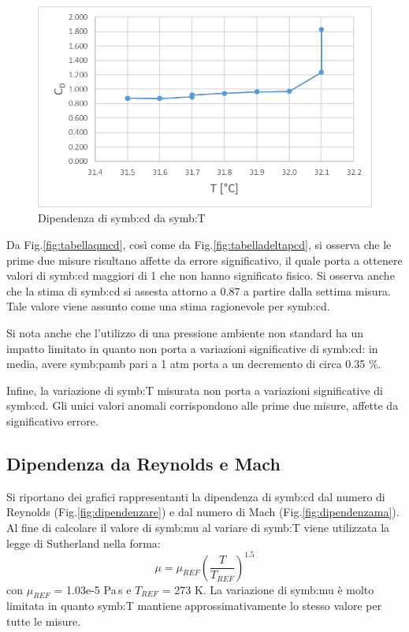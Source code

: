 \begin{figure}
	\centering
	\includegraphics[width=0.5\linewidth]{"chapters/5-laboratorio/tabellaTcd"}
	\caption{Dipendenza di \gls{symb:cd} da \gls{symb:T}}
	\label{fig:tabellatcd}
\end{figure}
Da Fig.\ref{fig:tabellaqmcd}, così come da Fig.\ref{fig:tabelladeltapcd}, si osserva che le prime due misure risultano affette da errore significativo, il quale porta a ottenere valori di \gls{symb:cd} maggiori di 1 che non hanno significato fisico. Si osserva anche che la stima di \gls{symb:cd} si assesta attorno a 0.87 a partire dalla settima misura. Tale valore viene assunto come una stima ragionevole per \gls{symb:cd}.

Si nota anche che l'utilizzo di una pressione ambiente non standard ha un impatto limitato in quanto non porta a variazioni significative di \gls{symb:cd}: in media, avere \gls{symb:pamb} pari a 1 atm porta a un decremento di circa 0.35 \%.

Infine, la variazione di \gls{symb:T} misurata non porta a variazioni significative di \gls{symb:cd}. Gli unici valori anomali corrispondono alle prime due misure, affette da significativo errore. 

\subsection{Dipendenza da Reynolds e Mach}
Si riportano dei grafici rappresentanti la dipendenza di \gls{symb:cd} dal numero di Reynolds (Fig.\ref{fig:dipendenzare}) e dal numero di Mach (Fig.\ref{fig:dipendenzama}). 
Al fine di calcolare il valore di \gls{symb:mu} al variare di \gls{symb:T} viene utilizzata la legge di Sutherland nella forma:
\begin{equation}
	\mu = \mu_{\textit{REF}} \left( \frac{T}{T_{\textit{REF}}} \right)^{1.5}
\end{equation}
con $\mu_{\textit{REF}}$ = 1.03e-5 Pa\,s e $T_{\textit{REF}}$ = 273 K.
La variazione di \gls{symb:mu} è molto limitata in quanto \gls{symb:T} mantiene approssimativamente lo stesso valore per tutte le misure. 

